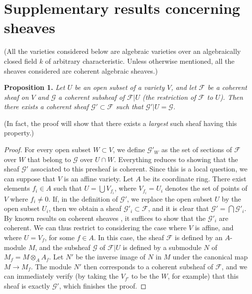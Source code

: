 \documentclass{article}
\newenvironment{itenv}[1]
  {\phantomsection\par\medskip\noindent\textbf{#1.}\itshape}
  {\medskip}
\newcommand{\scr}[1]{{\mathscr{#1}}}
\newcommand{\oldpage}[1]{\marginpar{\footnotesize$\Big\vert$ \textit{p.~#1}}}
\begin{document}
\section{Supplementary results concerning sheaves}
\label{section1}

(All the varieties considered below are algebraic varieties over an algebraically closed field $k$ of arbitrary characteristic. Unless otherwise mentioned, all the sheaves considered are coherent algebraic sheaves.)

\begin{itenv}{Proposition 1}
\label{proposition1}
\oldpage{98}
  Let $U$ be an open subset of a variety $V$, and let $\scr{F}$ be a coherent sheaf on $V$ and $\scr{G}$ a coherent subsheaf of $\scr{F}|U$ (the restriction of $\scr{F}$ to $U$).
  Then there exists a coherent sheaf $\scr{G}'\subset\scr{F}$ such that $\scr{G}'|U=\scr{G}$.
\end{itenv}

(In fact, the proof will show that there exists a \emph{largest} such sheaf having this property.)

\begin{proof}
  For every open subset $W\subset V$, we define $\scr{G}'_W$ as the set of sections of $\scr{F}$ over $W$ that belong to $\scr{G}$ over $U\cap W$.
  Everything reduces to showing that the sheaf $\scr{G}'$ associated to this presheaf is coherent.
  Since this is a local question, we can suppose that $V$ is an affine variety.
  Let $A$ be its coordinate ring.
  There exist elements $f_i\in A$ such that $U=\bigcup V_{f_i}$, where $V_{f_i}=U_i$ denotes the set of points of $V$ where $f_i\neq0$.
  If, in the definition of $\scr{G}'$, we replace the open subset $U$ by the open subset $U_i$, then we obtain a sheaf $\scr{G}'_i\subset\scr{F}$, and it is clear that $\scr{G}'=\bigcap\scr{G}'_i$.
  By known results on coherent sheaves \cite[p.~209]{12}, it suffices to show that the $\scr{G}'_i$ are coherent.
  We can thus restrict to considering the case where $V$ is affine, and where $U=V_f$, for some $f\in A$.
  In this case, the sheaf $\scr{F}$ is defined by an $A$-module $M$, and the subsheaf $\scr{G}$ of $\scr{F}|U$ is defined by a submodule $N$ of $M_f=M\otimes_A A_f$.
  Let $N'$ be the inverse image of $N$ in $M$ under the canonical map $M\to M_f$.
  The module $N'$ then corresponds to a coherent subsheaf of $\scr{F}$, and we can immediately verify (by taking the $V_{f'}$ to be the $W$, for example) that this sheaf is exactly $\scr{G}'$, which finishes the proof.
\end{proof}
\end{document}

